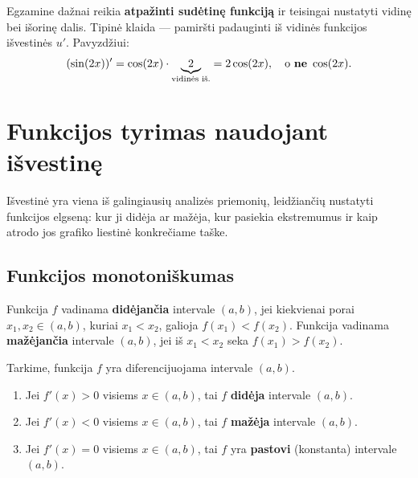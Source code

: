 \begin{tcolorbox}[title={Svarbi pastaba VBE}, colback=red!5, colframe=red!60!black]
Egzamine dažnai reikia \textbf{atpažinti sudėtinę funkciją} ir teisingai nustatyti
vidinę bei išorinę dalis. Tipinė klaida --- pamiršti padauginti iš vidinės funkcijos
išvestinės $u'$. Pavyzdžiui:
\[
    (\sin(2x))' = \cos(2x)\cdot\underbrace{2}_{\text{vidinės iš.}} = 2\cos(2x),
    \quad \text{o \textbf{ne} } \cos(2x).
\]
\end{tcolorbox}

\section{Funkcijos tyrimas naudojant išvestinę}

Išvestinė yra viena iš galingiausių analizės priemonių, leidžiančių nustatyti
funkcijos elgseną: kur ji didėja ar mažėja, kur pasiekia ekstremumus ir kaip
atrodo jos grafiko liestinė konkrečiame taške.

\subsection{Funkcijos monotoniškumas}

\begin{definition}
Funkcija $f$ vadinama \textbf{didėjančia} intervale $(a,b)$, jei kiekvienai
porai $x_1, x_2 \in (a,b)$, kuriai $x_1 < x_2$, galioja $f(x_1) < f(x_2)$.
Funkcija vadinama \textbf{mažėjančia} intervale $(a,b)$, jei iš $x_1 < x_2$
seka $f(x_1) > f(x_2)$.
\end{definition}

\begin{theorem}
Tarkime, funkcija $f$ yra diferencijuojama intervale $(a,b)$.
\begin{enumerate}
  \item Jei $f'(x) > 0$ visiems $x \in (a,b)$, tai $f$ \textbf{didėja}
        intervale $(a,b)$.
  \item Jei $f'(x) < 0$ visiems $x \in (a,b)$, tai $f$ \textbf{mažėja}
        intervale $(a,b)$.
  \item Jei $f'(x) = 0$ visiems $x \in (a,b)$, tai $f$ yra \textbf{pastovi}
        (konstanta) intervale $(a,b)$.
\end{enumerate}
\end{theorem}

